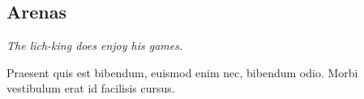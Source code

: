 \subsection{Arenas}
\textit{The lich-king does enjoy his games.}

\begin{quotebox}
Praesent quis est bibendum, euismod enim nec, bibendum odio. Morbi vestibulum erat id facilisis cursus.
\end{quotebox}
